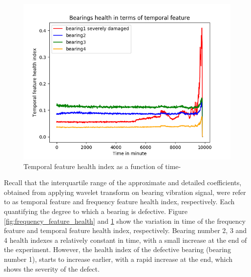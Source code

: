 \documentclass[../Main/thesis.tex]{subfiles}
\begin{document}
\begin{figure}[H] %
   \centering
   \includegraphics[width=5.3in]{../fig/temporal_feature_health.png} 
   \caption{Temporal feature health index as a function of time-}
   \label{fig:temporal_feature_health}
\end{figure}
\justify
Recall that the interquartile range of the approximate and detailed coefficients, obtained from applying wavelet transform on bearing vibration signal, were refer to as temporal feature and frequency feature health index, respectively. Each quantifying the degree to which a bearing is defective. Figure \ref{fig:frequency_feature_health} and \ref{fig:temporal_feature_health} show the variation in time of the frequency feature and temporal feature health index, respectively.
\justify
Bearing number 2, 3 and 4 health indexes a relatively constant in time, with a small increase at the end of the experiment. However, the health index of the defective bearing (bearing number 1), starts to increase earlier, with a rapid increase at the end, which shows the severity of the defect.



















\blankpage
\end{document}
